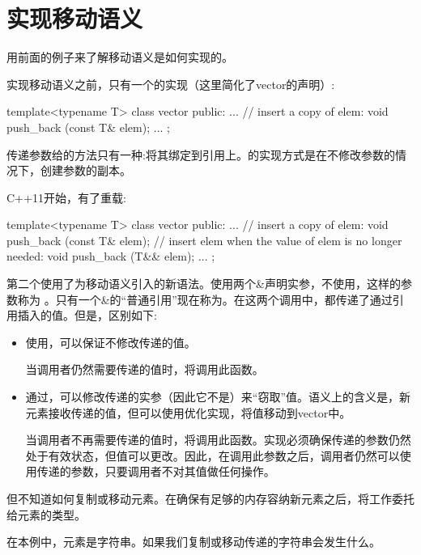 \section{实现移动语义}
用前面的例子来了解移动语义是如何实现的。

实现移动语义之前，只有一个的实现（这里简化了vector的声明）:

\begin{cppcode}
template<typename T>
class vector {
	public:
	...
	// insert a copy of elem:
	void push_back (const T& elem);
	...
};
\end{cppcode}

传递参数给的方法只有一种:将其绑定到引用上。的实现方式是在不修改参数的情况下，创建参数的副本。

C++11开始，有了重载:

\begin{cppcode}
template<typename T>
class vector {
	public:
	...
	// insert a copy of elem:
	void push_back (const T& elem);
	// insert elem when the value of elem is no longer needed:
	void push_back (T&& elem);
	...
};
\end{cppcode}

第二个使用了为移动语义引入的新语法。使用两个\&声明实参，不使用，这样的参数称为 。只有一个\&的“普通引用”现在称为。在这两个调用中，都传递了通过引用插入的值。但是，区别如下:

\begin{itemize}
	\item 使用，可以保证不修改传递的值。

	当调用者仍然需要传递的值时，将调用此函数。
	\item 通过，可以修改传递的实参（因此它不是）来“窃取”值。语义上的含义是，新元素接收传递的值，但可以使用优化实现，将值移动到vector中。

	当调用者不再需要传递的值时，将调用此函数。实现必须确保传递的参数仍然处于有效状态，但值可以更改。因此，在调用此参数之后，调用者仍然可以使用传递的参数，只要调用者不对其值做任何操作。
\end{itemize}

但不知道如何复制或移动元素。在确保有足够的内存容纳新元素之后，将工作委托给元素的类型。

在本例中，元素是字符串。如果我们复制或移动传递的字符串会发生什么。

